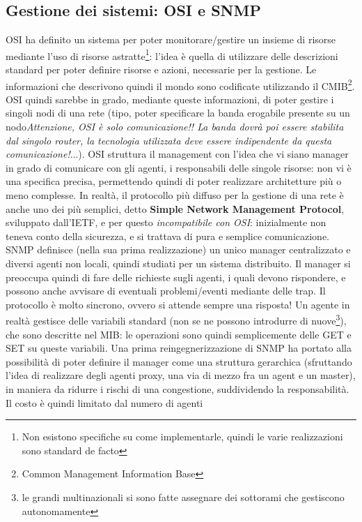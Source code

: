 \subsection{Gestione dei sistemi: OSI e SNMP}
OSI ha definito un sistema per poter monitorare/gestire un insieme di risorse mediante l'uso di risorse
astratte\footnote{Non esistono specifiche su come implementarle, quindi le varie realizzazioni sono standard de facto}:
l'idea è quella di utilizzare delle descrizioni standard per poter definire risorse e azioni, necessarie per la
gestione. Le informazioni che descrivono quindi il mondo sono codificate utilizzando il CMIB\footnote{Common Management
Information Base}. OSI quindi sarebbe in grado, mediante queste informazioni, di poter gestire i singoli nodi di una
rete (tipo, poter specificare la banda erogabile presente su un nodo\textit{Attenzione, OSI è solo comunicazione!! La
banda dovrà poi essere stabilita dal singolo router, la tecnologia utilizzata deve essere indipendente da questa
comunicazione!}...).
OSI struttura il management con l'idea che vi siano manager in grado di comunicare con gli agenti, i responsabili 
delle singole risorse: non vi è una specifica precisa, permettendo quindi di poter realizzare architetture più o meno
complesse.
In realtà, il protocollo più diffuso per la gestione di una rete è anche uno dei più semplici, detto \textbf{Simple
Network Management Protocol}, sviluppato dall'IETF, e per questo \textit{incompatibile con OSI}: inizialmente non 
teneva conto della sicurezza, e si trattava di pura e semplice comunicazione.
SNMP definisce (nella sua prima realizzazione) un unico manager centralizzato e diversi agenti non locali, quindi
studiati per un sistema distribuito. Il manager si preoccupa quindi di fare delle richieste sugli agenti, i quali 
devono rispondere, e possono anche avvisare di eventuali problemi/eventi mediante delle trap. Il protocollo è molto
sincrono, ovvero si attende sempre una risposta!
Un agente in realtà gestisce delle variabili standard (non se ne possono introdurre di nuove\footnote{le grandi
multinazionali si sono fatte assegnare dei sottorami che gestiscono autonomamente}), che sono descritte nel MIB: le
operazioni sono quindi semplicemente delle GET e SET su queste variabili.
Una prima reingegnerizzazione di SNMP ha portato alla possibilità di poter definire il manager come una struttura
gerarchica (sfruttando l'idea di realizzare degli agenti proxy, una via di mezzo fra un agent e un master), in maniera
da ridurre i rischi di una congestione, suddividendo la responsabilità. Il costo è quindi limitato dal numero di agenti
